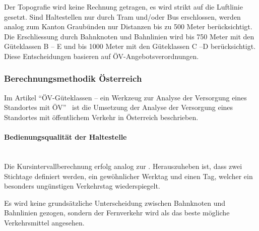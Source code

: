 Der Topografie wird keine Rechnung getragen, es wird strikt auf die Luftlinie gesetzt.
Sind Haltestellen nur durch Tram und/oder Bus erschlossen, werden analog zum Kanton Graubünden nur Distanzen bis zu 500 Meter berücksichtigt.
Die Erschliessung durch Bahnknoten und Bahnlinien wird bis 750 Meter mit den Güteklassen B -- E und bis 1000 Meter mit den Güteklassen C --D berücksichtigt.
Diese Entscheidungen basieren auf ÖV-Angebotsverordnungen.

\subsubsection{Berechnungsmethodik Österreich}
\label{Lösungsansätze:Berechnungsmethodik Österreich}

Im Artikel "`\acs{ÖV}-Güteklassen – ein Werkzeug zur Analyse der 
Versorgung eines Standortes mit ÖV"'~\cite{berechnung_oesterreich} ist die Umsetzung der Analyse der Versorgung eines Standortes mit öffentlichem Verkehr in Österreich beschrieben.

\paragraph{Bedienungsqualität der Haltestelle}~\\
\label{Berechnungsmethodik Österreich:Bedienungsqualität der Haltestelle}
Die Kursintervallberechnung erfolg analog zur .
Herauszuheben ist, dass zwei Stichtage definiert werden, ein gewöhnlicher Werktag und einen Tag, welcher ein besonders ungünstigen Verkehrstag wiederspiegelt.

Es wird keine grundsätzliche Unterscheidung zwischen Bahnknoten und Bahnlinien gezogen, sondern der Fernverkehr wird als das beste mögliche Verkehrsmittel angesehen.

